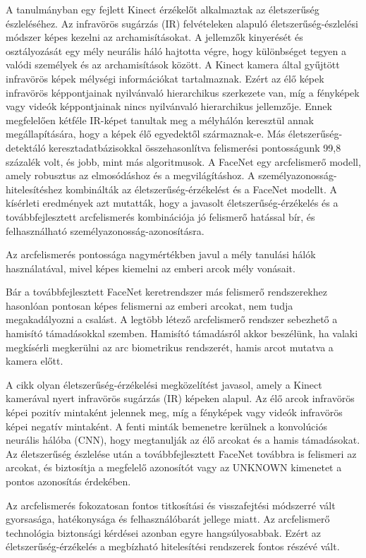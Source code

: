 A \cite{18} tanulmányban egy fejlett Kinect érzékelőt alkalmaztak az életszerűség észleléséhez. Az infravörös sugárzás (IR) felvételeken alapuló életszerűség-észlelési módszer képes kezelni az archamisításokat. A jellemzők kinyerését és osztályozását egy mély neurális háló hajtotta végre, hogy különbséget tegyen a valódi személyek és az archamisítások között. A Kinect kamera által gyűjtött infravörös képek mélységi információkat tartalmaznak. Ezért az élő képek infravörös képpontjainak nyilvánvaló hierarchikus szerkezete van, míg a fényképek vagy videók képpontjainak nincs nyilvánvaló hierarchikus jellemzője. Ennek megfelelően kétféle IR-képet tanultak meg a mélyhálón keresztül annak megállapítására, hogy a képek élő egyedektől származnak-e. Más életszerűség-detektáló keresztadatbázisokkal összehasonlítva felismerési pontosságunk 99,8 százalék volt, és jobb, mint más algoritmusok. A FaceNet egy arcfelismerő modell, amely robusztus az elmosódáshoz és a megvilágításhoz. A személyazonosság-hitelesítéshez kombinálták az életszerűség-érzékelést és a FaceNet modellt. A kísérleti eredmények azt mutatták, hogy a javasolt életszerűség-érzékelés és a továbbfejlesztett arcfelismerés kombinációja jó felismerő hatással bír, és felhasználható személyazonosság-azonosításra.

Az arcfelismerés pontossága nagymértékben javul a mély tanulási hálók használatával, mivel képes kiemelni az emberi arcok mély vonásait.

Bár a továbbfejlesztett FaceNet keretrendszer más felismerő rendszerekhez hasonlóan pontosan képes felismerni az emberi arcokat, nem tudja megakadályozni a csalást. A legtöbb létező arcfelismerő rendszer sebezhető a hamisító támadásokkal szemben. Hamisító támadásról akkor beszélünk, ha valaki megkísérli megkerülni az arc biometrikus rendszerét, hamis arcot mutatva a kamera előtt.

A \cite{18} cikk olyan életszerűség-érzékelési megközelítést javasol, amely a Kinect kamerával nyert infravörös sugárzás (IR) képeken alapul. Az élő arcok infravörös képei pozitív mintaként jelennek meg, míg a fényképek vagy videók infravörös képei negatív mintaként. A fenti minták bemenetre kerülnek a konvolúciós neurális hálóba (CNN), hogy megtanulják az élő arcokat és a hamis támadásokat. Az életszerűség észlelése után a továbbfejlesztett FaceNet továbbra is felismeri az arcokat, és biztosítja a megfelelő azonosítót vagy az UNKNOWN kimenetet a pontos azonosítás érdekében.

Az arcfelismerés fokozatosan fontos titkosítási és visszafejtési módszerré vált gyorsasága, hatékonysága és felhasználóbarát jellege miatt. Az arcfelismerő technológia biztonsági kérdései azonban egyre hangsúlyosabbak. Ezért az életszerűség-érzékelés a megbízható hitelesítési rendszerek fontos részévé vált.

